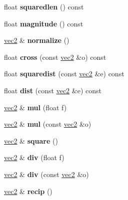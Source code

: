 \begin{DoxyCompactItemize}
float {\bfseries squaredlen} () const
\item 
\mbox{\label{structvec2_a697c65007d6d8c5e6c0127c22647bb33}} 
float {\bfseries magnitude} () const
\item 
\mbox{\label{structvec2_ac4b85481c753c0c385f9e0baf4d84338}} 
\hyperlink{structvec2}{vec2} \& {\bfseries normalize} ()
\item 
\mbox{\label{structvec2_a6aa0e9128a9827610f9efe99911e3c51}} 
float {\bfseries cross} (const \hyperlink{structvec2}{vec2} \&o) const
\item 
\mbox{\label{structvec2_a30ac135eb8d7330f7332a097385f0684}} 
float {\bfseries squaredist} (const \hyperlink{structvec2}{vec2} \&e) const
\item 
\mbox{\label{structvec2_a9cd9293018482c53d5b86ba6549703e3}} 
float {\bfseries dist} (const \hyperlink{structvec2}{vec2} \&e) const
\item 
\mbox{\label{structvec2_a0d18b8f2327e0939e4792501e1bf68b6}} 
\hyperlink{structvec2}{vec2} \& {\bfseries mul} (float f)
\item 
\mbox{\label{structvec2_a9a930fc1d28ef7b903772eb8a74adaa4}} 
\hyperlink{structvec2}{vec2} \& {\bfseries mul} (const \hyperlink{structvec2}{vec2} \&o)
\item 
\mbox{\label{structvec2_a81592c14c3c5ec83f014ae07e09f654e}} 
\hyperlink{structvec2}{vec2} \& {\bfseries square} ()
\item 
\mbox{\label{structvec2_a85a74bffcb7f4ca0b1933745f829e650}} 
\hyperlink{structvec2}{vec2} \& {\bfseries div} (float f)
\item 
\mbox{\label{structvec2_aa311b573d8e109ce51cb0332f435cbb7}} 
\hyperlink{structvec2}{vec2} \& {\bfseries div} (const \hyperlink{structvec2}{vec2} \&o)
\item 
\mbox{\label{structvec2_aa128b8b00fceb08e12bcd1ca83f17845}} 
\hyperlink{structvec2}{vec2} \& {\bfseries recip} ()
\item 

\end{DoxyCompactItemize}

